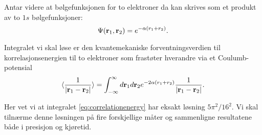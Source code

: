 \documentclass[11pt]{article}
\begin{document}
Antar videre at bølgefunksjonen for to elektroner da kan skrives som et produkt av
to $1s$ bølgefunksjoner:
\[
   \Psi({\bf r}_1,{\bf r}_2)  =   e^{-\alpha (r_1+r_2)}.
\]

Integralet vi skal løse er den kvantemekaniske forventningsverdien
til korrelasjonsenergien til to elektroner som frastøter hverandre via et Coulumb-potensial
\begin{equation}\label{eq:correlationenergy}
   \langle \frac{1}{|{\bf r}_1-{\bf r}_2|} \rangle =
   \int_{-\infty}^{\infty} d{\bf r}_1d{\bf r}_2  e^{-2\alpha (r_1+r_2)}\frac{1}{|{\bf r}_1-{\bf r}_2|}.
\end{equation}

Her vet vi at integralet \eqref{eq:correlationenergy} har eksakt løsning $5\pi^2/16^2$. Vi skal tilnærme denne 
løsningen på fire forskjellige måter og sammenligne resultatene både i presisjon og kjøretid.



\printbibliography
\end{document}
